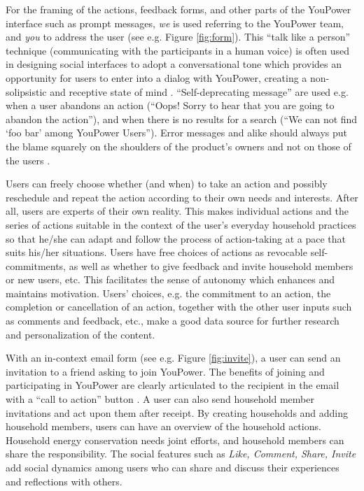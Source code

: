 For the framing of the actions, feedback forms, and other parts of the YouPower interface such as prompt messages, \textit{we} is used referring to the YouPower team, and \textit{you} to address the user (see e.g. Figure \ref{fig:form}). This ``talk like a person'' technique (communicating with the participants in a human voice) is often used in designing social interfaces to adopt a conversational tone which provides an opportunity for users to enter into a dialog with YouPower, creating a non-solipsistic and receptive state of mind \citep{Crumlish2009}. ``Self-deprecating message'' are used e.g. when a user abandons an action (``Oops! Sorry to hear that you are going to abandon the action''), and when there is no results for a search (``We can not find `foo bar' among YouPower Users''). Error messages and alike should always put the blame squarely on the shoulders of the product's owners and not on those of the users \citep{Crumlish2009}. 

Users can freely choose whether (and when) to take an action and possibly reschedule and repeat the action according to their own needs and interests. After all, users are experts of their own reality. This makes individual actions and the series of actions suitable in the context of the user's everyday household practices so that he/she can adapt and follow the process of action-taking at a pace that suits his/her situations. Users have free choices of actions as revocable self-commitments, as well as whether to give feedback and invite household members or new users, etc. This facilitates the sense of autonomy which enhances and maintains motivation. Users' choices, e.g. the commitment to an action, the completion or cancellation of an action, together with the other user inputs such as comments and feedback, etc., make a good data source for further research and personalization of the content. 

With an in-context email form (see e.g. Figure \ref{fig:invite}), a user can send an invitation to a friend asking to join YouPower. The benefits of joining and participating in YouPower are clearly articulated to the recipient in the email with a ``call to action'' button \citep{Crumlish2009}. A user can also send household member invitations and act upon them after receipt. By creating households and adding household members, users can have an overview of the household actions. Household energy conservation needs joint efforts, and household members can share the responsibility. The social features such as \textit{Like, Comment, Share, Invite} add social dynamics among users who can share and discuss their experiences and reflections with others. 
